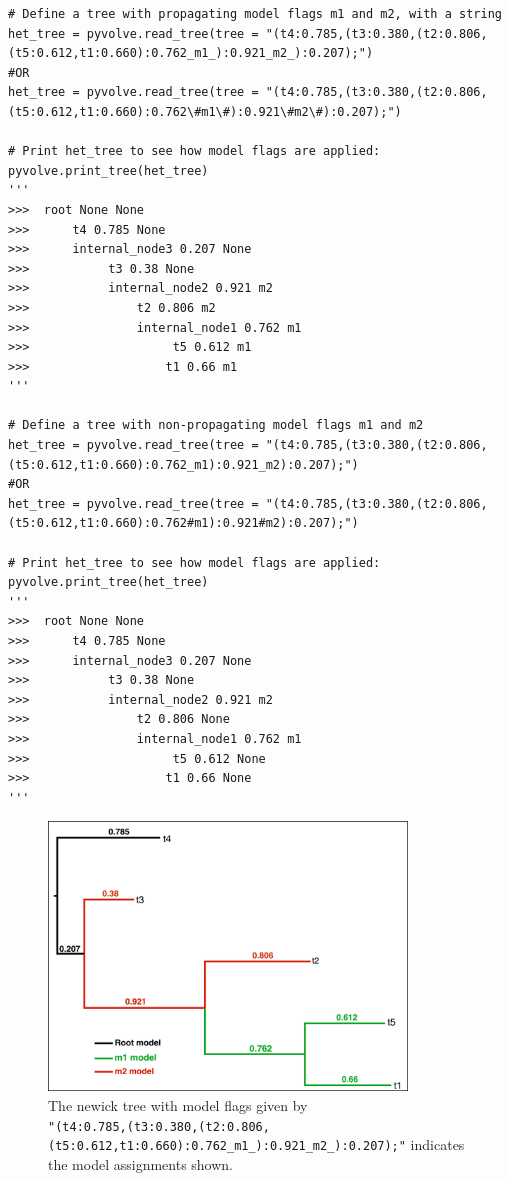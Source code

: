 \documentclass{article}
\begin{document}
\begin{lstlisting}
# Define a tree with propagating model flags m1 and m2, with a string
het_tree = pyvolve.read_tree(tree = "(t4:0.785,(t3:0.380,(t2:0.806,(t5:0.612,t1:0.660):0.762_m1_):0.921_m2_):0.207);")
#OR
het_tree = pyvolve.read_tree(tree = "(t4:0.785,(t3:0.380,(t2:0.806,(t5:0.612,t1:0.660):0.762\#m1\#):0.921\#m2\#):0.207);")

# Print het_tree to see how model flags are applied:
pyvolve.print_tree(het_tree)
'''
>>>  root None None
>>>      t4 0.785 None
>>>      internal_node3 0.207 None
>>>           t3 0.38 None
>>>           internal_node2 0.921 m2
>>>               t2 0.806 m2
>>>               internal_node1 0.762 m1
>>>                    t5 0.612 m1
>>>                   t1 0.66 m1
'''

# Define a tree with non-propagating model flags m1 and m2
het_tree = pyvolve.read_tree(tree = "(t4:0.785,(t3:0.380,(t2:0.806,(t5:0.612,t1:0.660):0.762_m1):0.921_m2):0.207);")
#OR
het_tree = pyvolve.read_tree(tree = "(t4:0.785,(t3:0.380,(t2:0.806,(t5:0.612,t1:0.660):0.762#m1):0.921#m2):0.207);")

# Print het_tree to see how model flags are applied:
pyvolve.print_tree(het_tree)
'''
>>>  root None None
>>>      t4 0.785 None
>>>      internal_node3 0.207 None
>>>           t3 0.38 None
>>>           internal_node2 0.921 m2
>>>               t2 0.806 None
>>>               internal_node1 0.762 m1
>>>                    t5 0.612 None
>>>                   t1 0.66 None
'''
\end{lstlisting}


\begin{figure}[htpb]%
	\includegraphics[width=3.75in]{treeflags_colors.pdf}
	\caption{\label{fig:treeflags} The newick tree with model flags given by \\ \texttt{\scriptsize{"(t4:0.785,(t3:0.380,(t2:0.806,(t5:0.612,t1:0.660):0.762\_m1\_):0.921\_m2\_):0.207);"}}
		indicates the model assignments shown.}
\end{figure}
\end{document}
